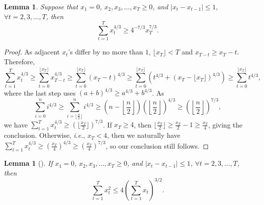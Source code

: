 \documentclass[11pt,fullpage,letterpaper]{article} %
\newtheorem{lemma}[theorem]{Lemma}
\begin{document}
\begin{lemma}\label{lem:4/3 lower bound}
Suppose that $x_1=0$, $x_2,x_3,\ldots,x_T\ge 0$, and $\lvert x_t-x_{t-1}\rvert\le 1$, $\forall t=2,3,\ldots,T$, then
\begin{equation*}
\sum_{t=1}^T x_t^{4/3} \ge 4^{-7/3} x_T^{7/3}.
\end{equation*}
\end{lemma}
\begin{proof}
As adjacent $x_t$'s differ by no more than $1$, $\lfloor x_T\rfloor < T$ and $x_{T-t}\ge x_T - t$. Therefore,
\begin{equation*}
\sum_{t=1}^T x_t^{4/3} \ge \sum_{t=0}^{\lfloor x_T\rfloor} x_{T-t}^{4/3}\ge \sum_{t=0}^{\lfloor x_T\rfloor} (x_T-t)^{4/3} \ge \sum_{t=0}^{\lfloor x_T\rfloor} \left (t^{4/3} + (x_T - \lfloor x_T\rfloor)^{4/3}\right )\ge \sum_{t=0}^{\lfloor x_T\rfloor} t^{4/3},
\end{equation*}
where the last step uses $(a+b)^{4/3} \ge a^{4/3} + b^{4/3}$.
As
\begin{equation*}
\sum_{i=0}^n i^{4/3} \ge \sum_{i=\lfloor \frac n2 \rfloor}^n i^{4/3} \ge \left (n - \left \lfloor \frac n2 \right \rfloor\right ) \left (\left \lfloor \frac n2 \right \rfloor\right )^{4/3} \ge \left (\left \lfloor \frac n2 \right \rfloor\right )^{7/3},
\end{equation*}
we have $\sum_{t=1}^T x_t^{4/3} \ge (\lfloor \frac{x_T}{2}\rfloor )^{7/3}$. If $x_T\ge 4$, then $\lfloor \frac{x_T}{2}\rfloor \ge \frac{x_T}{2}-1 \ge \frac{x_T}{4}$, giving the conclusion. Otherwise, \textit{i.e.}, $x_T<4$, then we naturally have $\sum_{t=1}^T x_t^{4/3} \ge (\frac{x_T}{4})^{4/3}\ge (\frac{x_T}{4})^{7/3}$, so our conclusion still follows.
\end{proof}

\begin{lemma}[{\citep[Lemma 4]{huang2023queue}}]\label{lem:2 upper bound}
If $x_1=0$, $x_2,x_3,\ldots,x_T\ge 0$, and $\lvert x_t-x_{t-1}\rvert\le 1$, $\forall t=2,3,\ldots,T$, then
\begin{equation*}
\sum_{t=1}^T x_t^2 \le 4 \left (\sum_{t=1}^T x_t\right )^{3/2}.
\end{equation*}
\end{lemma}
\end{document}
